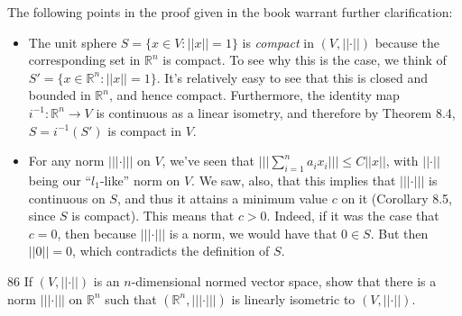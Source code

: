 \begin{solution}
    
    The following points in the proof given in the book warrant further clarification:
    \begin{itemize}
        \item The unit sphere $S = \{x \in V: \lvert \lvert x \rvert \rvert = 1\}$ is \textit{compact} in $(V, \lvert \lvert \cdot \rvert \rvert)$ because the corresponding set in $\mathbb{R}^n$ is compact.
        To see why this is the case, we think of $S' = \{x \in \mathbb{R}^n: \lvert \lvert x \rvert \rvert = 1\}$.
        It's relatively easy to see that this is closed and bounded in $\mathbb{R}^n$, and hence compact.
        Furthermore, the identity map $i^{-1}: \mathbb{R}^n \rightarrow V$ is continuous as a linear isometry, and therefore by Theorem 8.4, $S = i^{-1}(S')$ is compact in $V$.
        \item For any norm $\lvert \lvert \lvert \cdot \rvert \rvert \rvert$ on $V$, we've seen that $\lvert \lvert \lvert \sum_{i=1}^{n} a_i x_i \rvert \rvert \rvert \leq C \lvert \lvert x \rvert \rvert$, with $\lvert \lvert \cdot \rvert \rvert$ being our ``$l_1$-like'' norm on $V$.
        We saw, also, that this implies that $\lvert \lvert \lvert \cdot \rvert \rvert \rvert$ is continuous on $S$, and thus it attains a minimum value $c$ on it (Corollary 8.5, since $S$ is compact).
        This means that $c > 0$.
        Indeed, if it was the case that $c = 0$, then because $\lvert \lvert \lvert \cdot \rvert \rvert \rvert$ is a norm, we would have that $0 \in S$.
        But then $\lvert \lvert 0 \rvert \rvert = 0$, which contradicts the definition of $S$.
    \end{itemize}
\end{solution}

\begin{exercise}{86}
    If $(V, \lvert \lvert \cdot \rvert \rvert)$ is an $n$-dimensional normed vector space, show that there is a norm $\lvert \lvert \lvert \cdot \rvert \rvert \rvert$ on $\mathbb{R}^n$ such that $(\mathbb{R}^n, \lvert \lvert \lvert \cdot \rvert \rvert \rvert)$ is linearly isometric to $(V, \lvert \lvert \cdot \rvert \rvert)$.
\end{exercise}

